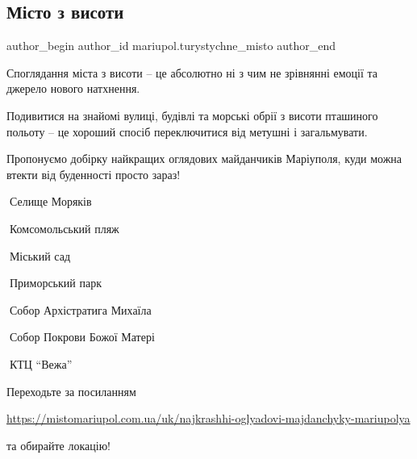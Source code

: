  
 
 
 
 

\subsection{Місто з висоти}
\label{sec:28_11_2021.fb.mariupol.turystychne_misto.1.misto_z_vysoty}

\ifcmt
 author_begin
   author_id mariupol.turystychne_misto
 author_end
\fi

Споглядання міста з висоти – це абсолютно ні з чим не зрівнянні емоції та джерело нового натхнення. 

Подивитися на знайомі вулиці, будівлі та морські обрії з висоти пташиного
польоту – це хороший спосіб переключитися від метушні і загальмувати. 

Пропонуємо добірку найкращих оглядових майданчиків Маріуполя, куди можна втекти від буденності просто зараз!

🌅Селище Моряків\par
🌅Комсомольський пляж\par
🌅Міський сад\par
🌅Приморський парк\par
🌅Собор Архістратига Михаїла \par
🌅Собор Покрови Божої Матері\par
🌅КТЦ \enquote{Вежа}\par

Переходьте за посиланням 

\url{https://mistomariupol.com.ua/uk/najkrashhi-oglyadovi-majdanchyky-mariupolya}

та обирайте локацію!

